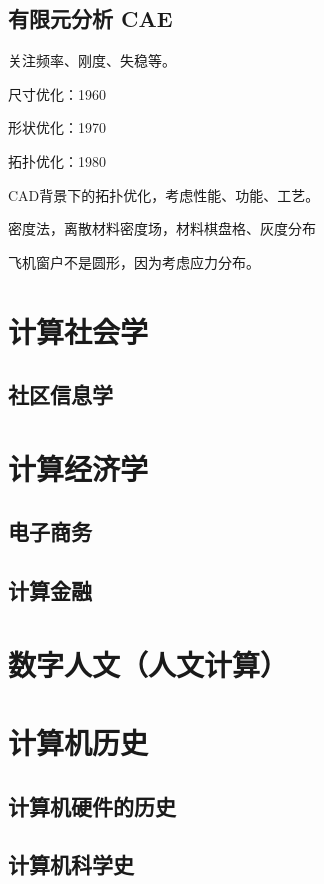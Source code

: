 \documentclass[UTF8]{../computerUniverse}
\begin{document}
\section{有限元分析 CAE}

关注频率、刚度、失稳等。


尺寸优化：1960~

形状优化：1970~

拓扑优化：1980~

CAD背景下的拓扑优化，考虑性能、功能、工艺。

密度法，离散材料密度场，材料棋盘格、灰度分布

飞机窗户不是圆形，因为考虑应力分布。





\chapter{计算社会学}
\section{社区信息学}

\chapter{计算经济学}
\section{电子商务}
\section{计算金融}


\chapter{数字人文（人文计算）}

\chapter{计算机历史}
\section{计算机硬件的历史}
\section{计算机科学史}
\end{document}
